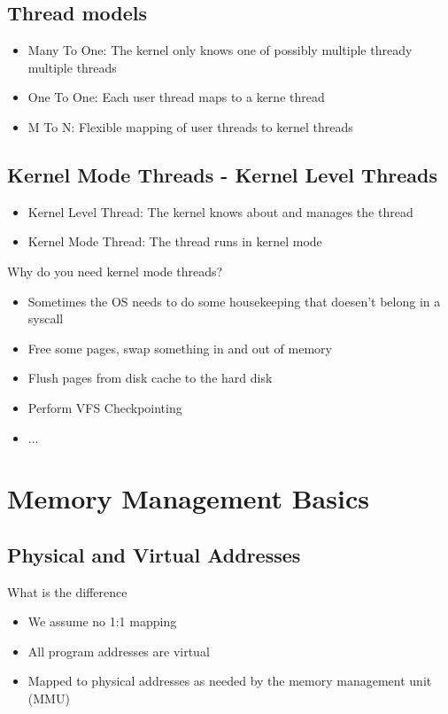 \documentclass{kit}
\begin{document}
  \subsection{Thread models}
    \begin{itemize}
      \item Many To One: The kernel only knows one of possibly multiple thready multiple threads
      \item One To One: Each user thread maps to a kerne thread
      \item M To N: Flexible mapping of user threads to kernel threads
    \end{itemize}
  \subsection{Kernel Mode Threads - Kernel Level Threads}
    \begin{itemize}
      \item Kernel Level Thread: The kernel knows about and manages the thread
      \item Kernel Mode Thread: The thread runs in kernel mode
    \end{itemize}
    Why do you need kernel mode threads?
    \begin{itemize}
      \item Sometimes the OS needs to do some housekeeping that doesen't belong in a syscall
      \item Free some pages, swap something in and out of memory
      \item Flush pages from disk cache to the hard disk
      \item Perform VFS Checkpointing
      \item ...
    \end{itemize}
\section{Memory Management Basics}
  \subsection{Physical and Virtual Addresses}
    What is the difference
    \begin{itemize}
      \item We assume no 1:1 mapping
      \item All program addresses are virtual
      \item Mapped to physical addresses as needed by the memory management unit (MMU)
    \end{itemize}
\end{document}

